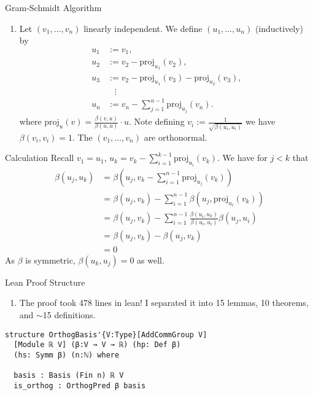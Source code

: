 \documentclass{beamer}
\newcommand{\proj}{\text{proj}}
\begin{document}
\begin{frame}{Gram-Schmidt Algorithm}

\begin{enumerate}
\item Let $(v_1, \dots, v_n)$ linearly independent. We define $(u_1, \dots, u_n)$ (inductively) by
\begin{align*}
u_1&:=v_1,\\
u_2&:=v_2-\proj_{u_1}(v_2),\\
u_3&:=v_2-\proj_{u_1}(v_3)-\proj_{u_2}(v_3),\\
&\,\,\,\,\,\vdots\\
u_n &:= v_n-\sum_{j=1}^{n-1} \proj_{u_j}(v_n).
\end{align*}
where $\proj_u(v) = \frac{\beta(v,u)}{\beta(u,u)} \cdot u$. 
Note defining $v_i := \frac{1}{\sqrt{\beta(u_i,u_i)}}$ 
we have $\beta(v_i,v_i)=1$. The $(v_1, \dots, v_n)$ are orthonormal. 
\end{enumerate}
\end{frame}

\begin{frame}{Calculation}
Recall $v_1=u_1$, $u_k  =v_k-\sum_{i=1}^{k-1}\proj_{u_i}(v_k)$. We have for $j<k$ that
\begin{align*}
\beta \left(u_j, u_k\right)&=\beta \left(u_j, v_k-\sum_{i=1}^{n-1} \proj_{u_j}(v_k)\right)\\
&= \beta(u_j,v_k)-\sum_{i=1}^{n-1} \beta(u_j, \proj_{u_i}(v_k))\\
&= \beta(u_j, v_k)-\sum_{i=1}^{n-1} \frac{\beta(u_i, u_k)}{\beta(u_i,u_i)} \beta(u_j, u_i)\\
&= \beta(u_j,v_k)-\beta(u_j,v_k)\\
&= 0
\end{align*}
As $\beta$ is symmetric, $\beta(u_k,u_j)=0$ as well. 

\end{frame}


\begin{frame}{Lean Proof Structure}

\begin{enumerate}
\item The proof took 478 lines in lean! I separated it into 15 lemmas, 10 theorems, and $\sim$15 definitions. 
\end{enumerate}



\end{frame}

{
\begin{verbatim}
structure OrthogBasis'{V:Type}[AddCommGroup V] 
  [Module ℝ V] (β:V → V → ℝ) (hp: Def β)
  (hs: Symm β) (n:ℕ) where
  
  basis : Basis (Fin n) ℝ V
  is_orthog : OrthogPred β basis
\end{verbatim}
}
\end{document}
